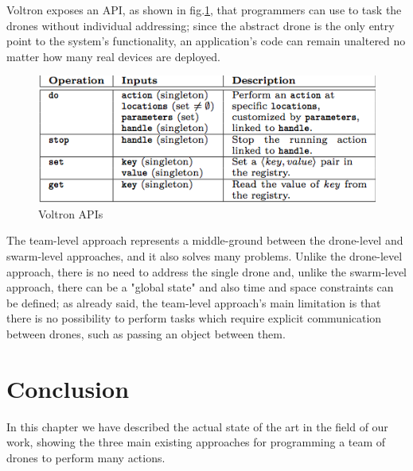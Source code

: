 Voltron\cite{voltron} exposes an API, as shown in fig.\ref{fig:voltron}, that programmers can use to task the drones without individual addressing; since the abstract drone is the only entry point to the system’s functionality, an application’s code can remain unaltered no matter how many real devices are deployed.
\\

\begin{figure}[htbp]
  \centering
  \includegraphics[width=\linewidth]{pictures/Voltron.png}
  \caption{Voltron APIs}
  \label{fig:voltron}
\end{figure}


The team-level approach represents a  middle-ground between the drone-level and swarm-level approaches, and it also solves many problems. Unlike the drone-level approach, there is no need to address the single drone and, unlike the swarm-level approach, there can be a "global state" and also time and space constraints can be defined; as already said, the team-level approach's main limitation is that there is no possibility to perform tasks which require explicit communication between drones, such as passing an object between them.

\newpage

\section{Conclusion}

In this chapter we have described the actual state of the art in the field of our work, showing the three main existing approaches for programming a team of drones to perform many actions.

